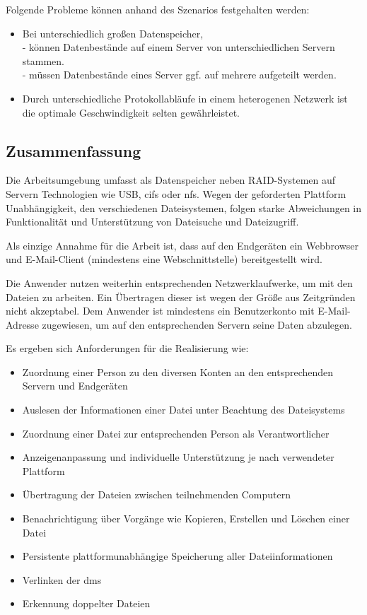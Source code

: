 \documentclass[oneside, ngerman, toc=bibliography,bibliography=totoc,listof=entryprefix, open=right,numbers=noenddot,fontsize=12pt]{scrbook}
\begin{document}
\bigskip
Folgende Probleme können anhand des Szenarios festgehalten werden:
\begin{itemize}
	\item Bei unterschiedlich großen Datenspeicher,\\
    - können Datenbestände auf einem Server von unterschiedlichen Servern stammen.\\
    - müssen Datenbestände eines Server ggf. auf mehrere aufgeteilt werden.
	\item Durch unterschiedliche Protokollabläufe in einem heterogenen Netzwerk ist die optimale Geschwindigkeit selten gewährleistet.
\end{itemize}
 
\subsection*{Zusammenfassung}
Die Arbeitsumgebung umfasst als Datenspeicher neben RAID-Systemen auf Servern Technologien  wie USB,  \acrshort{cifs} oder \acrshort{nfs}. Wegen der geforderten Plattform Unabhängigkeit, den verschiedenen Dateisystemen, folgen starke Abweichungen in Funktionalität und Unterstützung von Dateisuche und Dateizugriff.

Als einzige Annahme für die Arbeit ist, dass auf den Endgeräten ein Webbrowser und  E-Mail-Client (mindestens eine Webschnittstelle) bereitgestellt wird.

Die Anwender nutzen weiterhin entsprechenden Netzwerklaufwerke, um mit den Dateien zu arbeiten.
Ein Übertragen dieser ist wegen der Größe aus Zeitgründen nicht akzeptabel. Dem Anwender ist mindestens ein Benutzerkonto mit E-Mail-Adresse zugewiesen, um auf den entsprechenden Servern seine Daten abzulegen. 

\bigskip
Es ergeben sich Anforderungen für die Realisierung wie:
\begin{itemize}
\item Zuordnung einer Person zu den diversen Konten an den entsprechenden Servern und Endgeräten
\item Auslesen der Informationen einer Datei unter Beachtung des Dateisystems
\item Zuordnung einer Datei zur entsprechenden Person als Verantwortlicher
\item Anzeigenanpassung und individuelle Unterstützung je nach verwendeter Plattform
\item Übertragung der Dateien zwischen teilnehmenden Computern
\item Benachrichtigung über Vorgänge wie Kopieren, Erstellen und Löschen einer Datei
\item Persistente plattformunabhängige Speicherung aller Dateiinformationen 
\item Verlinken der \acrshort{dms}
\item Erkennung doppelter Dateien
\end{itemize}
 
\end{document}
